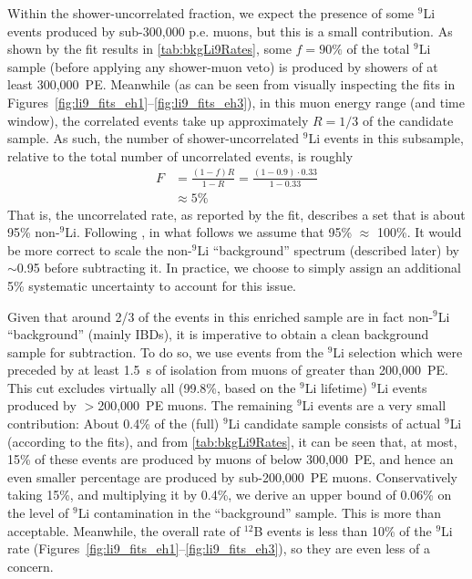 \documentclass[../thesis.tex]{subfiles}
\begin{document}
Within the shower-uncorrelated fraction, we expect the presence of some $^9$Li events produced by sub-300,000 p.e. muons, but this is a small contribution. As shown by the fit results in \autoref{tab:bkgLi9Rates}, some $f = 90\%$ of the total $^9$Li sample (before applying any shower-muon veto) is produced by showers of at least 300,000~PE. Meanwhile (as can be seen from visually inspecting the fits in Figures~\ref{fig:li9_fits_eh1}--\ref{fig:li9_fits_eh3}), in this muon energy range (and time window), the correlated events take up approximately $R = 1/3$ of the candidate sample. As such, the number of shower-uncorrelated $^9$Li events in this subsample, relative to the total number of uncorrelated events, is roughly
\begin{equation}
  \label{eq:bkgLi9SpecExtractErr}
  \begin{aligned}
    F &= \frac{(1 - f)R}{1 - R} = \frac{(1 - 0.9) \cdot 0.33}{1 - 0.33} \\
    &\approx 5\%
  \end{aligned}
\end{equation}
That is, the uncorrelated rate, as reported by the fit, describes a set that is about 95\% non-$^9$Li. Following \cite{ChrisLi9}, in what follows we assume that 95\% $\approx$ 100\%. It would be more correct to scale the non-$^9$Li ``background'' spectrum (described later) by $\sim$0.95 before subtracting it. In practice, we choose to simply assign an additional 5\% systematic uncertainty to account for this issue.

Given that around 2/3 of the events in this enriched sample are in fact non-$^9$Li ``background'' (mainly IBDs), it is imperative to obtain a clean background sample for subtraction. To do so, we use events from the $^9$Li selection which were preceded by at least 1.5~s of isolation from muons of greater than 200,000~PE. This cut excludes virtually all (99.8\%, based on the $^9$Li lifetime) $^9$Li events produced by $>$200,000~PE muons. The remaining $^9$Li events are a very small contribution: About 0.4\% of the (full) $^9$Li candidate sample consists of actual $^9$Li (according to the fits), and from \autoref{tab:bkgLi9Rates}, it can be seen that, at most, 15\% of these events are produced by muons of below 300,000~PE, and hence an even smaller percentage are produced by sub-200,000~PE muons. Conservatively taking 15\%, and multiplying it by 0.4\%, we derive an upper bound of 0.06\% on the level of $^9$Li contamination in the ``background'' sample. This is more than acceptable. Meanwhile, the overall rate of $^{12}$B events is less than 10\% of the $^9$Li rate (Figures~\ref{fig:li9_fits_eh1}--\ref{fig:li9_fits_eh3}), so they are even less of a concern.
\end{document}
